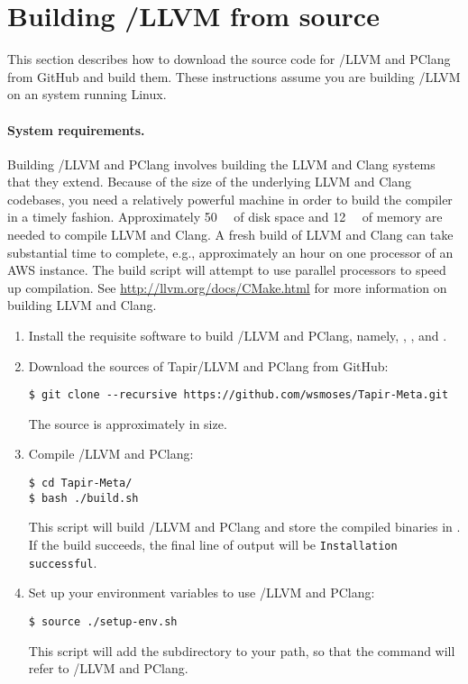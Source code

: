 \section{Building \tapir/LLVM from source}\label{sec:install}

This section describes how to download the source code for \tapir/LLVM
and PClang from GitHub and build them.  These instructions assume you
are building \tapir/LLVM on an \arch system running Linux.

\paragraph{System requirements.}  Building \tapir/LLVM and PClang
involves building the LLVM and Clang systems that they extend.
Because of the size of the underlying LLVM and Clang codebases, you
need a relatively powerful machine in order to build the compiler in a
timely fashion.  Approximately \SI{50}{\gibi\byte} of disk space and
\SI{12}{\gibi\byte} of memory are needed to compile LLVM and Clang.  A
fresh build of LLVM and Clang can take substantial time to complete,
e.g., approximately an hour on one processor of an AWS \AWSinst
instance.  The build script will attempt to use parallel processors to
speed up compilation.  See \url{http://llvm.org/docs/CMake.html} for
more information on building LLVM and Clang.

\begin{enumerate}
\item Install the requisite software to build \tapir/LLVM and PClang,
  namely, , , and .

\item Download the sources of Tapir/LLVM and PClang from
  GitHub:
\begin{verbatim}
$ git clone --recursive https://github.com/wsmoses/Tapir-Meta.git
\end{verbatim}
  The source is approximately  in
  size.

\item Compile \tapir/LLVM and PClang:
\begin{verbatim}
$ cd Tapir-Meta/
$ bash ./build.sh
\end{verbatim}
  This script will build \tapir/LLVM and PClang and store the compiled
  binaries in .  If the build succeeds, the
  final line of output will be \texttt{Installation successful}.

\item Set up your environment variables to use \tapir/LLVM and PClang:
\begin{verbatim}
$ source ./setup-env.sh
\end{verbatim}
  This script will add the 
  subdirectory to your path, so that the  command will
  refer to \tapir/LLVM and PClang.
\end{enumerate}


